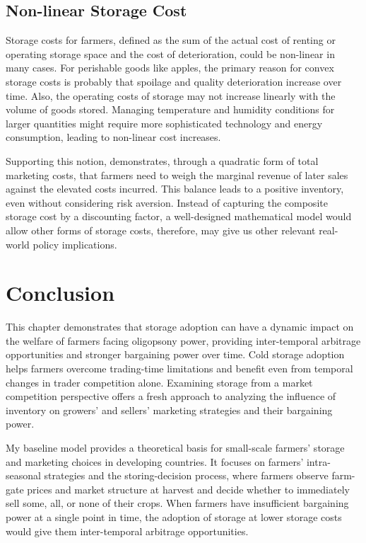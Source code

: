 \subsection{Non-linear Storage Cost}
\noindent Storage costs for farmers, defined as the sum of the actual cost of renting or operating storage space and the cost of deterioration, could be non-linear in many cases. For perishable goods like apples, the primary reason for convex storage costs is probably that spoilage and quality deterioration increase over time. Also, the operating costs of storage may not increase linearly with the volume of goods stored. Managing temperature and humidity conditions for larger quantities might require more sophisticated technology and energy consumption, leading to non-linear cost increases.

Supporting this notion, \cite{williams1989economic} demonstrates, through a quadratic form of total marketing costs, that farmers need to weigh the marginal revenue of later sales against the elevated costs incurred. This balance leads to a positive inventory, even without considering risk aversion. Instead of capturing the composite storage cost by a discounting factor, a well-designed mathematical model would allow other forms of storage costs, therefore, may give us other relevant real-world policy implications.



\section{Conclusion}
\noindent This chapter demonstrates that storage adoption can have a dynamic impact on the welfare of farmers facing oligopsony power, providing inter-temporal arbitrage opportunities and stronger bargaining power over time. Cold storage adoption helps farmers overcome trading-time limitations and benefit even from temporal changes in trader competition alone. Examining storage from a market competition perspective offers a fresh approach to analyzing the influence of inventory on growers' and sellers' marketing strategies and their bargaining power.

My baseline model provides a theoretical basis for small-scale farmers' storage and marketing choices in developing countries. It focuses on farmers' intra-seasonal strategies and the storing-decision process, where farmers observe farm-gate prices and market structure at harvest and decide whether to immediately sell some, all, or none of their crops. When farmers have insufficient bargaining power at a single point in time, the adoption of storage at lower storage costs would give them inter-temporal arbitrage opportunities. 

